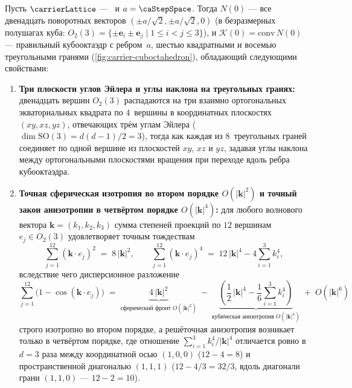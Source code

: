 \begin{proposition}
\label{prop:cubocta-fcc}
Пусть $\carrierLattice$ --- \latGCK\ и $a=\caStepSpace$.
Тогда $N(0)$ --- все двенадцать поворотных векторов $(\pm a/\sqrt{2},\pm a/\sqrt{2},0)$ (в безразмерных полушагах куба: $O_2(3)=\{\pm\mathbf{e}_i\pm\mathbf{e}_j \mid 1\le i<j\le 3\}$),
и $\mathcal{K}(0)=\mathrm{conv}\,N(0)$ --- правильный кубооктаэдр с ребром~$a$,
шестью квадратными и восемью треугольными гранями (\cref{fig:carrier-cuboctahedron}), обладающий следующими свойствами:
\begin{enumerate}[label=(\roman*)]
\item \textbf{Три плоскости углов Эйлера и углы наклона на треугольных гранях:}
  двенадцать вершин $O_2(3)$ распадаются на три взаимно ортогональных экваториальных квадрата по $4$~вершины в координатных плоскостях $(xy,xz,yz)$, отвечающих трём углам Эйлера ($\dim\mathrm{SO}(3)=d(d-1)/2=3$), тогда как каждая из $8$~треугольных граней соединяет по одной вершине из плоскостей $xy$, $xz$ и $yz$, задавая углы наклона между ортогональными плоскостями вращения при переходе вдоль ребра кубооктаэдра.
\item \textbf{Точная сферическая изотропия во втором порядке $O(|\mathbf{k}|^2)$ и точный закон анизотропии в четвёртом порядке $O(|\mathbf{k}|^4)$:}
  для любого волнового вектора $\mathbf{k}=(k_1,k_2,k_3)$ сумма степеней проекций по $12$ вершинам $e_j\in O_2(3)$ удовлетворяет точным тождествам
  \begin{equation}
    \label{eq:cuboct-moments-2-4}
    \sum_{j=1}^{12} (\mathbf{k}\cdot e_j)^2 \;=\; 8\,|\mathbf{k}|^2,\qquad
    \sum_{j=1}^{12} (\mathbf{k}\cdot e_j)^4 \;=\; 12\,|\mathbf{k}|^4 - 4\sum_{i=1}^3 k_i^4,
  \end{equation}
  вследствие чего дисперсионное разложение
  \begin{equation}
    \label{eq:cuboct-dispersion-2-4}
    \sum_{j=1}^{12}\bigl(1 - \cos(\mathbf{k}\cdot e_j)\bigr)
    \;=\; \underbrace{4\,|\mathbf{k}|^2}_{\text{сферический фронт }O(|\mathbf{k}|^2)}
    \;-\; \underbrace{\left(\frac{1}{2}\,|\mathbf{k}|^4 - \frac{1}{6}\sum_{i=1}^3 k_i^4\right)}_{\text{кубическая анизотропия }O(|\mathbf{k}|^4)}
    \;+\; O(|\mathbf{k}|^6)
  \end{equation}
  строго изотропно во втором порядке, а решёточная анизотропия возникает только в четвёртом порядке, где отношение $\sum_{i=1}^3 k_i^4/|\mathbf{k}|^4$ отличается ровно в $d=3$ раза между координатной осью $(1,0,0)$ ($12-4=8$) и пространственной диагональю $(1,1,1)$ ($12-4/3=32/3$, вдоль диагонали грани $(1,1,0)$ --- $12-2=10$).
\end{enumerate}
\end{proposition}


